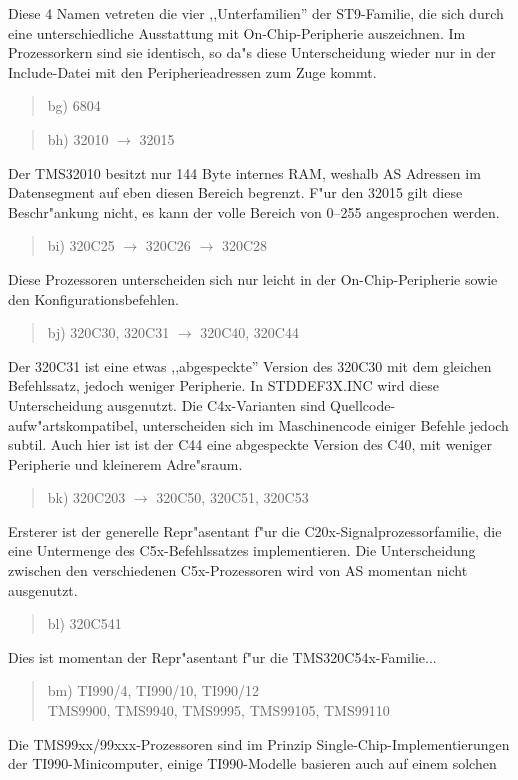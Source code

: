 \documentclass[12pt,a4paper,twoside]{report}
\begin{document}
Diese 4 Namen vetreten die vier ,,Unterfamilien'' der ST9-Familie, die
sich durch eine unterschiedliche Ausstattung mit On-Chip-Peripherie
auszeichnen.  Im Prozessorkern sind sie identisch, so da"s diese
Unterscheidung wieder nur in der Include-Datei mit den Peripherieadressen zum
Zuge kommt.
\begin{quote}
bg) 6804
\end{quote}
\begin{quote}
bh) 32010 $\rightarrow$ 32015
\end{quote}
Der TMS32010 besitzt nur 144 Byte internes RAM, weshalb AS Adressen im
Datensegment auf eben diesen Bereich begrenzt.  F"ur den 32015 gilt diese
Beschr"ankung nicht, es kann der volle Bereich von 0--255 angesprochen
werden.
\begin{quote}
bi) 320C25 $\rightarrow$ 320C26 $\rightarrow$ 320C28
\end{quote}
Diese Prozessoren unterscheiden sich nur leicht in der
On-Chip-Peripherie sowie den Konfigurationsbefehlen.
\begin{quote}
bj) 320C30, 320C31 $\rightarrow$ 320C40, 320C44
\end{quote}
Der 320C31 ist eine etwas ,,abgespeckte'' Version des 320C30 mit dem
gleichen Befehlssatz, jedoch weniger Peripherie.  In STDDEF3X.INC
wird diese Unterscheidung ausgenutzt.  Die C4x-Varianten sind
Quellcode-aufw"artskompatibel, unterscheiden sich im
Maschinencode einiger Befehle jedoch subtil.  Auch hier ist ist
der C44 eine abgespeckte Version des C40, mit weniger Peripherie
und kleinerem Adre"sraum.
\begin{quote}
bk) 320C203 $\rightarrow$ 320C50, 320C51, 320C53
\end{quote}
Ersterer ist der generelle Repr"asentant f"ur die
C20x-Signalprozessorfamilie, die eine Untermenge des C5x-Befehlssatzes
implementieren.  Die Unterscheidung zwischen den verschiedenen
C5x-Prozessoren wird von AS momentan nicht ausgenutzt.
\begin{quote}
bl) 320C541
\end{quote}
Dies ist momentan der Repr"asentant f"ur die TMS320C54x-Familie...
\begin{quote}
bm) TI990/4, TI990/10, TI990/12 \\
    TMS9900, TMS9940, TMS9995, TMS99105, TMS99110
\end{quote}
Die TMS99xx/99xxx-Prozessoren sind im Prinzip Single-Chip-Implementierungen
der TI990-Minicomputer, einige TI990-Modelle basieren auch auf einem solchen
\end{document}
